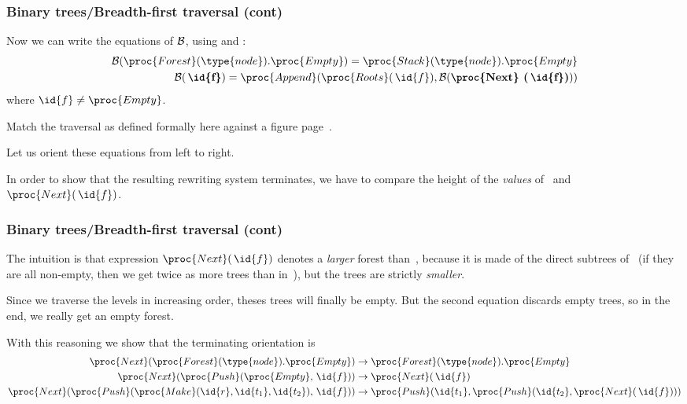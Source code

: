 %
\begin{frame}
\frametitle{Binary trees/Breadth-first traversal (cont)}
\label{forest_bfs}

Now we can write the equations of \({\cal B}\), using
 and :
\begin{eqnarray*}
  {\cal B} (\proc{Forest}(\type{node}).\proc{Empty})
= \proc{Stack}(\type{node}).\proc{Empty}\\
  {\cal B} (\,\textbf{\id{f}})
= \proc{Append} (\proc{Roots} (\,\id{f}), {\cal B}
  (\textbf{\proc{Next} (\,\id{f})}))
\end{eqnarray*}
where \(\id{f} \neq \proc{Empty}\).

\bigskip

Match the traversal as defined formally here against a figure
page~\pageref{breadth_first_pictures}.

\bigskip

Let us orient these equations from left to right. 

\bigskip

In order to show that the resulting rewriting system terminates, we
have to compare the height of the \emph{values} of \, and
\(\proc{Next} (\,\id{f})\).

\end{frame}

%
\begin{frame}
\frametitle{Binary trees/Breadth-first traversal (cont)}

The intuition is that expression \(\proc{Next} (\,\id{f})\)
denotes a \emph{larger} forest than \,, because it is made of
the direct subtrees of \, (if they are all non-empty, then we
get twice as more trees than in \,), but the trees are strictly
\emph{smaller}.

\bigskip

Since we traverse the levels in increasing order, theses trees will
finally be empty. But the second equation discards empty trees, so in
the end, we really get an empty forest.

\bigskip

With this reasoning we show that the terminating orientation is
\begin{align*}
   \proc{Next} (\proc{Forest}(\type{node}).\proc{Empty}) 
&\rightarrow \proc{Forest} (\type{node}).\proc{Empty}\\
   \proc{Next} (\proc{Push} (\proc{Empty}, \,\id{f}))
&\rightarrow \proc{Next} (\,\id{f})\\
   \proc{Next} (\proc{Push} (\proc{Make} (\id{r}, \id{t_1},
   \id{t_2}), \,\id{f}))
&\rightarrow \proc{Push} (\id{t_1}, \proc{Push} (\id{t_2}, \proc{Next}
   (\,\id{f})))
\end{align*}

\end{frame}
